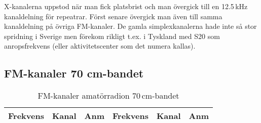 X-kanalerna uppstod när man fick platsbrist och man övergick till en
12.5\,kHz kanaldelning för repeatrar. Först senare övergick man även
till samma kanaldelning på övriga FM-kanaler. De gamla
simplexkanalerna hade inte så stor spridning i Sverige men förekom
rikligt t.ex. i Tyskland med S20 som anropsfrekvens (eller
aktivitetscenter som det numera kallas).

\clearpage

\subsection{FM-kanaler 70 cm-bandet}

\small

\begin{longtable}{rrl|rrl}
\caption{FM-kanaler amatörradion 70\,cm-bandet}\\
\textbf{Frekvens} & \textbf{Kanal} & \textbf{Anm} &
\textbf{Frekvens} & \textbf{Kanal} & \textbf{Anm} \\ \hline


\end{longtable}
